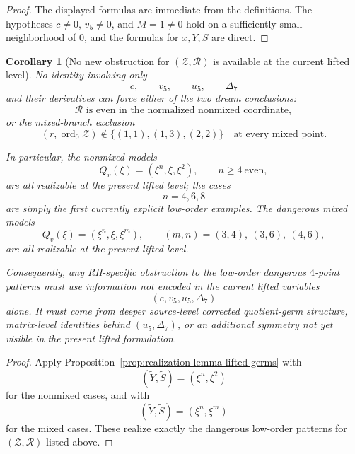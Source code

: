 \documentclass[11pt,a4paper]{amsart}
\theoremstyle{plain}
\newtheorem{corollary}[theorem]{Corollary}
\theoremstyle{definition}
\begin{document}
\begin{proof}
The displayed formulas are immediate from the definitions. The hypotheses
$c\neq 0$, $v_5\neq 0$, and $M=1\neq 0$ hold on a sufficiently small
neighborhood of $0$, and the formulas for $x,Y,S$ are direct.
\end{proof}

\begin{corollary}[No new obstruction for $(\mathcal Z,\mathcal R)$ is available at the current lifted level]
\label{cor:no-new-jet-obstruction-current-lifted-level}
No identity involving only
\[
c,\qquad v_5,\qquad u_5,\qquad \Delta_7
\]
and their derivatives can force either of the two dream conclusions:
\[
\mathcal R \text{ is even in the normalized nonmixed coordinate},
\]
or the mixed-branch exclusion
\[
(r,\operatorname{ord}_0\mathcal Z)\notin\{(1,1),(1,3),(2,2)\}
\quad\text{at every mixed point.}
\]

In particular, the nonmixed models
\[
Q_v(\xi)=(\xi^n,\xi,\xi^2),
\qquad n\ge 4 \ \text{even},
\]
are all realizable at the present lifted level; the cases
\[
n=4,6,8
\]
are simply the first currently explicit low-order examples.
The dangerous mixed models
\[
Q_v(\xi)=(\xi^n,\xi,\xi^m),
\qquad (m,n)=(3,4),\ (3,6),\ (4,6),
\]
are all realizable at the present lifted level.

Consequently, any RH-specific obstruction to the low-order dangerous
$4$-point patterns must use information not encoded in the current lifted
variables
\[
(c,v_5,u_5,\Delta_7)
\]
alone. It must come from deeper source-level corrected quotient-germ
structure, matrix-level identities behind $(u_5,\Delta_7)$, or an additional
symmetry not yet visible in the present lifted formulation.
\end{corollary}

\begin{proof}
Apply Proposition~\ref{prop:realization-lemma-lifted-germs} with
\[
(\widetilde Y,\widetilde S)=(\xi^n,\xi^2)
\]
for the nonmixed cases, and with
\[
(\widetilde Y,\widetilde S)=(\xi^n,\xi^m)
\]
for the mixed cases. These realize exactly the dangerous low-order patterns for
$(\mathcal Z,\mathcal R)$ listed above.
\end{proof}
\end{document}
